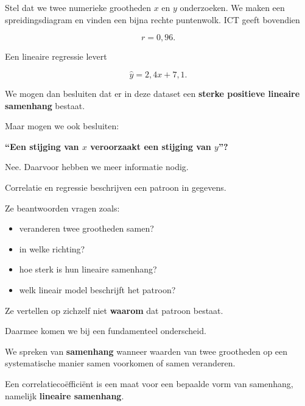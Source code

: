 \documentclass{ximera}
\begin{document}

Stel dat we twee numerieke grootheden $x$ en $y$ onderzoeken. We maken een spreidingsdiagram en vinden een bijna rechte puntenwolk.
ICT geeft bovendien

\[
r=0{,}96.
\]

Een lineaire regressie levert

\[
\hat y=2{,}4x+7{,}1.
\]

We mogen dan besluiten dat er in deze dataset een
\textbf{sterke positieve lineaire samenhang} bestaat.

Maar mogen we ook besluiten:

\begin{center}
\textbf{``Een stijging van $x$ veroorzaakt een stijging van $y$''?}
\end{center}

Nee. Daarvoor hebben we meer informatie nodig.

\begin{opmerking}
Correlatie en regressie beschrijven een patroon in gegevens.

Ze beantwoorden vragen zoals:

\begin{itemize}
  \item veranderen twee grootheden samen?
  \item in welke richting?
  \item hoe sterk is hun lineaire samenhang?
  \item welk lineair model beschrijft het patroon?
\end{itemize}

Ze vertellen op zichzelf niet \textbf{waarom} dat patroon bestaat.
\end{opmerking}

Daarmee komen we bij een fundamenteel onderscheid.



\begin{definitie}
We spreken van \textbf{samenhang} wanneer waarden van twee grootheden
op een systematische manier samen voorkomen of samen veranderen.
\end{definitie}

Een correlatiecoëfficiënt is een maat voor een bepaalde vorm van
samenhang, namelijk \textbf{lineaire samenhang}.
\end{document}

